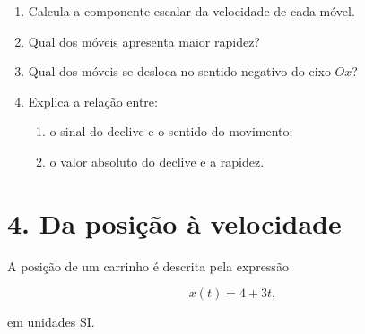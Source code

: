 \documentclass[11pt,a4paper]{article}
\newcommand{\resposta}[1][0.8]{
	\vspace{#1cm}
}
\begin{document}
	\begin{enumerate}[label=\textbf{\arabic*.},resume]
		
		\item Calcula a componente escalar da velocidade de cada móvel.
		
		\resposta[1.5]
		
		\item Qual dos móveis apresenta maior rapidez?
		
		\resposta[0.7]
		
		\item Qual dos móveis se desloca no sentido negativo do eixo $Ox$?
		
		\resposta[0.7]
		
		\item Explica a relação entre:
		
		\begin{enumerate}[label=\alph*)]
			\item o sinal do declive e o sentido do movimento;
			\item o valor absoluto do declive e a rapidez.
		\end{enumerate}
		
		\resposta[1.3]
		
	\end{enumerate}
	
	\section{4. Da posição à velocidade}
	
	A posição de um carrinho é descrita pela expressão
	
	\[
	x(t)=4+3t,
	\]
	
	em unidades SI.
	
\end{document}
